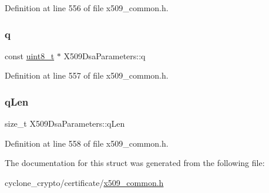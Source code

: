 Definition at line 556 of file x509\+\_\+common.\+h.

\mbox{\label{structX509DsaParameters_a8d55a808e46108ce0b7c2af09926f913}} 
\subsubsection{\texorpdfstring{q}{q}}
{\footnotesize\ttfamily const \hyperlink{stdint_8h_aba7bc1797add20fe3efdf37ced1182c5}{uint8\+\_\+t} $\ast$ X509\+Dsa\+Parameters\+::q}



Definition at line 557 of file x509\+\_\+common.\+h.

\mbox{\label{structX509DsaParameters_a2cb0e6cf41cb0b07dfccedc79bce007e}} 
\subsubsection{\texorpdfstring{q\+Len}{qLen}}
{\footnotesize\ttfamily size\+\_\+t X509\+Dsa\+Parameters\+::q\+Len}



Definition at line 558 of file x509\+\_\+common.\+h.



The documentation for this struct was generated from the following file\+:\begin{DoxyCompactItemize}
\item 
cyclone\+\_\+crypto/certificate/\hyperlink{certificate_2x509__common_8h}{x509\+\_\+common.\+h}\end{DoxyCompactItemize}
